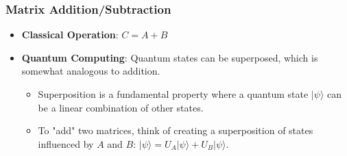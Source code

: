 \documentclass{article}
\begin{document}
\subsubsection{Matrix Addition/Subtraction}
\begin{itemize}
    \item \textbf{Classical Operation}: \( C = A + B \)
    \item \textbf{Quantum Computing}: Quantum states can be superposed, which is somewhat analogous to addition. 
    \begin{itemize}
        \item Superposition is a fundamental property where a quantum state \( |\psi\rangle \) can be a linear combination of other states. 
        \item To "add" two matrices, think of creating a superposition of states influenced by \( A \) and \( B \): \( |\psi\rangle = U_A|\psi\rangle + U_B|\psi\rangle \).
    \end{itemize}   
\end{itemize}
\end{document}
